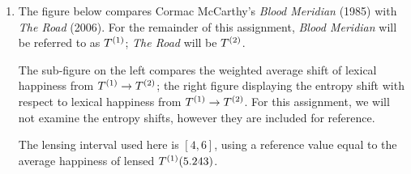 \begin{enumerate}
   \solutionstart





  

   
  \begin{enumerate}[wide, labelwidth=!, labelindent=0pt]
  \item
    
    The figure below compares Cormac McCarthy's \textit{Blood Meridian} (1985) with \textit{The Road} (2006).
    For the remainder of this assignment,
    \textit{Blood Meridian} will be referred to as $T^{(1)}$; \textit{The Road} will be $T^{(2)}$.

    The sub-figure on the left compares the weighted average shift of lexical happiness from $T^{(1)} \to T^{(2)}$;
    the right figure displaying the entropy shift with respect to lexical happiness from $T^{(1)} \to T^{(2)}$. For this assignment, we will not examine the entropy shifts, however they are included for reference.
    
    The lensing interval used here is $[4,6]$, 
    using a reference value equal to the average happiness of lensed $T^{(1)} (5.243)$.


\end{enumerate}
\end{enumerate}
